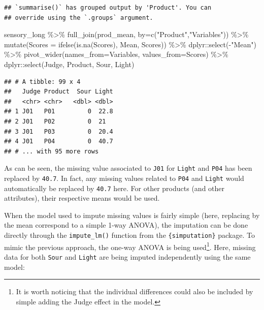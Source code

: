 \documentclass[
]{krantz}
\makeatletter
\newenvironment{Shaded}{\begin{snugshade}}{\end{snugshade}}
\newcommand{\AttributeTok}[1]{\textcolor[rgb]{0.61,0.61,0.61}{#1}}
\newcommand{\FunctionTok}[1]{\textcolor[rgb]{0,0,0}{#1}}
\newcommand{\NormalTok}[1]{#1}
\newcommand{\SpecialCharTok}[1]{\textcolor[rgb]{0,0,0}{#1}}
\newcommand{\StringTok}[1]{\textcolor[rgb]{0.5,0.5,0.5}{#1}}
\newenvironment{kframe}{%
\medskip{}
\setlength{\fboxsep}{.8em}
 \def\at@end@of@kframe{}%
 \ifinner\ifhmode%
  \def\at@end@of@kframe{\end{minipage}}%
  \begin{minipage}{\columnwidth}%
 \fi\fi%
 \def\FrameCommand##1{\hskip\@totalleftmargin \hskip-\fboxsep
 \colorbox{shadecolor}{##1}\hskip-\fboxsep
     \hskip-\linewidth \hskip-\@totalleftmargin \hskip\columnwidth}%
 \MakeFramed {\advance\hsize-\width
   \@totalleftmargin\z@ \linewidth\hsize
   \@setminipage}}%
 {\par\unskip\endMakeFramed%
 \at@end@of@kframe}
\renewenvironment{Shaded}{\begin{kframe}}{\end{kframe}}
\makeatother
\begin{document}
\begin{verbatim}
## `summarise()` has grouped output by 'Product'. You can
## override using the `.groups` argument.
\end{verbatim}

\begin{Shaded}
\begin{Highlighting}[]
\NormalTok{sensory\_long }\SpecialCharTok{\%\textgreater{}\%} 
  \FunctionTok{full\_join}\NormalTok{(prod\_mean, }\AttributeTok{by=}\FunctionTok{c}\NormalTok{(}\StringTok{"Product"}\NormalTok{,}\StringTok{"Variables"}\NormalTok{)) }\SpecialCharTok{\%\textgreater{}\%} 
  \FunctionTok{mutate}\NormalTok{(}\AttributeTok{Scores =} \FunctionTok{ifelse}\NormalTok{(}\FunctionTok{is.na}\NormalTok{(Scores), Mean, Scores)) }\SpecialCharTok{\%\textgreater{}\%} 
\NormalTok{  dplyr}\SpecialCharTok{::}\FunctionTok{select}\NormalTok{(}\SpecialCharTok{{-}}\StringTok{"Mean"}\NormalTok{) }\SpecialCharTok{\%\textgreater{}\%} 
  \FunctionTok{pivot\_wider}\NormalTok{(}\AttributeTok{names\_from=}\NormalTok{Variables, }\AttributeTok{values\_from=}\NormalTok{Scores) }\SpecialCharTok{\%\textgreater{}\%} 
\NormalTok{  dplyr}\SpecialCharTok{::}\FunctionTok{select}\NormalTok{(Judge, Product, Sour, Light)}
\end{Highlighting}
\end{Shaded}

\begin{verbatim}
## # A tibble: 99 x 4
##   Judge Product  Sour Light
##   <chr> <chr>   <dbl> <dbl>
## 1 J01   P01         0  22.8
## 2 J01   P02         0  21  
## 3 J01   P03         0  20.4
## 4 J01   P04         0  40.7
## # ... with 95 more rows
\end{verbatim}

As can be seen, the missing value associated to \texttt{J01} for \texttt{Light} and \texttt{P04} has been replaced by \texttt{40.7}. In fact, any missing values related to \texttt{P04} and \texttt{Light} would automatically be replaced by \texttt{40.7} here. For other products (and other attributes), their respective means would be used.

When the model used to impute missing values is fairly simple (here, replacing by the mean correspond to a simple 1-way ANOVA), the imputation can be done directly through the \texttt{impute\_lm()} function from the \texttt{\{simputation\}} package. To mimic the previous approach, the one-way ANOVA is being used\footnote{It is worth noticing that the individual differences could also be included by simple adding the Judge effect in the model.}. Here, missing data for both \texttt{Sour} and \texttt{Light} are being imputed independently using the same model:
\end{document}
